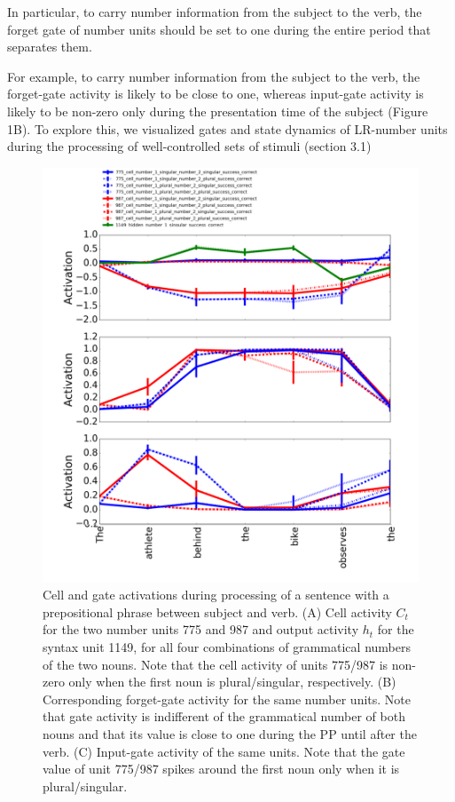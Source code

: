 In particular, to carry number information from the subject to the verb, the forget gate of number units should be set to one during the entire period that separates them. 

For example, to carry number information from the subject to the verb, the forget-gate activity is likely to be close to one, whereas input-gate activity is likely to be non-zero only during the presentation time of the subject (Figure 1B). To explore this, we visualized gates and state dynamics of LR-number units during the processing of well-controlled sets of stimuli (section 3.1)

\begin{figure}[t]
\includegraphics[width=\linewidth]{Figures/Figure2_number_units.png}
\caption{Cell and gate activations during processing of a sentence with a prepositional phrase between subject and verb. (A) Cell activity $C_t$ for the two number units 775 and 987 and output activity $h_t$ for the syntax unit 1149, for all four combinations of grammatical numbers of the two nouns. Note that the cell activity of units 775/987 is non-zero only when the first noun is plural/singular, respectively. (B) Corresponding forget-gate activity for the same number units. Note that gate activity is indifferent of the grammatical number of both nouns and that its value is close to one during the PP until after the verb. (C) Input-gate activity of the same units. Note that the gate value of unit 775/987 spikes around the first noun only when it is plural/singular.}
\end{figure}

